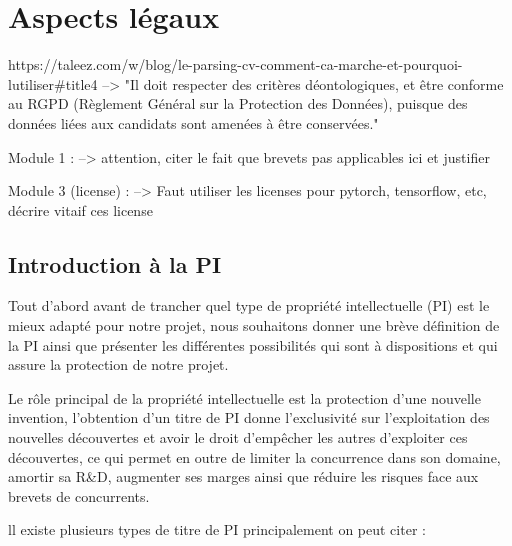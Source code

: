 \section{Aspects légaux}\label{section:aspects_legaux}

%
%


https://taleez.com/w/blog/le-parsing-cv-comment-ca-marche-et-pourquoi-lutiliser#title4
--> "Il doit respecter des critères déontologiques, et être conforme au RGPD (Règlement Général sur la Protection des Données), puisque des données liées aux candidats sont amenées à être conservées."

Module 1 : 
--> attention, citer le fait que brevets pas applicables ici et justifier


Module 3 (license) : 
--> Faut utiliser les licenses pour pytorch, tensorflow, etc, décrire vitaif ces license

\subsection{Introduction à la PI}
Tout d’abord avant de trancher quel type de propriété intellectuelle (PI) est le mieux adapté pour notre projet, nous souhaitons donner  une brève définition de la PI ainsi que présenter les  différentes possibilités qui sont à dispositions et qui assure la protection de notre projet.

Le rôle principal de la propriété intellectuelle est la protection d’une nouvelle invention, l’obtention d’un titre de PI donne l’exclusivité sur l’exploitation des nouvelles  découvertes et avoir le droit d'empêcher les autres d'exploiter ces découvertes, ce qui permet en outre de  limiter la concurrence dans son domaine, amortir sa R&D, augmenter ses marges ainsi que réduire les risques face aux brevets de concurrents.

ll existe plusieurs  types de titre de PI principalement on peut citer :  

